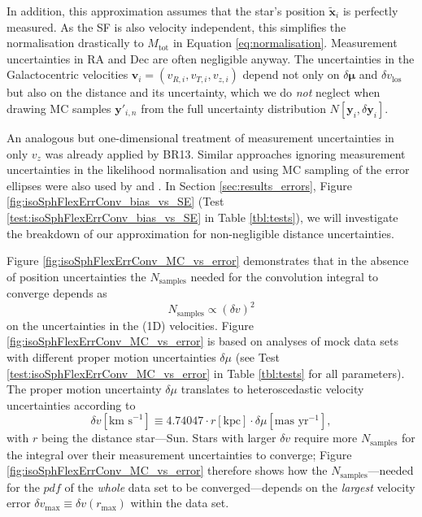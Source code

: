 \documentclass[iop,revtex4,numberedappendix,appendixfloats]{emulateapj}
\newcommand{\vect}[1]{\boldsymbol{#1}}
\newcommand{\pdf}{\ensuremath{pdf}}
\begin{document}
In addition, this approximation assumes that the star's position $\tilde{\vect{x}}_i$ is perfectly measured. As the SF is also velocity independent, this simplifies the normalisation drastically to $M_\text{tot}$ in Equation \eqref{eq:normalisation}. Measurement uncertainties in $\mathrm{RA}$ and $\mathrm{Dec}$ are often negligible anyway. The uncertainties in the Galactocentric velocities $\vect{v}_i = (v_{R,i},v_{T,i},v_{z,i})$ depend not only on $\delta \vect{\mu}$ and $\delta v_\text{los}$ but also on the distance and its uncertainty, which we do \emph{not} neglect when drawing MC samples $\vect{y}'_{i,n}$ from the full uncertainty distribution $N[\vect{y}_i,\delta \vect{y}_i]$. 

An analogous but one-dimensional treatment of measurement uncertainties in only $v_z$ was already applied by BR13. Similar approaches ignoring measurement uncertainties in the likelihood normalisation and using MC sampling of the error ellipses were also used by \citet{2013MNRAS.433.1411M} and \citet{2016arXiv160309332D}. In Section \ref{sec:results_errors}, Figure \ref{fig:isoSphFlexErrConv_bias_vs_SE} (Test \ref{test:isoSphFlexErrConv_bias_vs_SE} in Table \ref{tbl:tests}), we will investigate the breakdown of our approximation for non-negligible distance uncertainties.

Figure \ref{fig:isoSphFlexErrConv_MC_vs_error} demonstrates that in the absence of position uncertainties the $N_\text{samples}$ needed for the convolution integral to converge depends as
\begin{equation*}
N_\text{samples} \propto \left( \delta v \right)^2
\end{equation*}
on the uncertainties in the (1D) velocities. 
Figure \ref{fig:isoSphFlexErrConv_MC_vs_error} is based on analyses of mock data sets with different proper motion uncertainties $\delta \mu$ (see Test \ref{test:isoSphFlexErrConv_MC_vs_error} in Table \ref{tbl:tests} for all parameters). The proper motion uncertainty $\delta \mu$ translates to heteroscedastic velocity uncertainties according to 
\begin{equation*}
\delta v [\text{km s}^{-1}] \equiv 4.74047 \cdot r[\text{kpc}] \cdot \delta \mu [\text{mas yr}^{-1}],
\end{equation*}
with $r$ being the distance star---Sun. Stars with larger $\delta v$ require more $N_\text{samples}$ for the integral over their measurement uncertainties to converge; Figure \ref{fig:isoSphFlexErrConv_MC_vs_error} therefore shows how the $N_\text{samples}$---needed for the \pdf{} of the \emph{whole} data set to be converged---depends on the \emph{largest} velocity error $\delta v_\text{max} \equiv \delta v(r_\text{max})$ within the data set.
\end{document}
